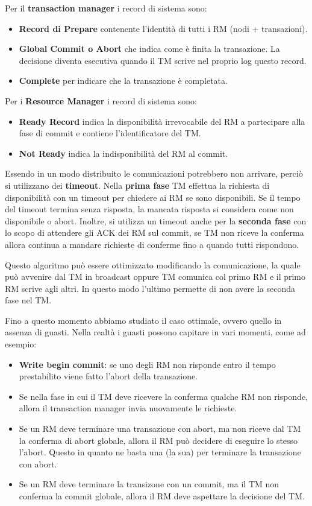 Per il \textbf{transaction manager} i record di sistema sono:
\begin{itemize}
    \item \textbf{Record di Prepare} contenente l'identità di tutti i RM (nodi + transazioni).
    \item \textbf{Global Commit o Abort} che indica come è finita la transazione. La
          decisione diventa esecutiva quando il TM scrive nel proprio log
          questo record.
    \item \textbf{Complete} per indicare che la transazione è completata.
\end{itemize}
Per i \textbf{Resource Manager} i record di sistema sono:
\begin{itemize}
    \item \textbf{Ready Record} indica la disponibilità irrevocabile del RM a partecipare
          alla fase di commit e contiene l'identificatore del TM.
    \item \textbf{Not Ready} indica la indisponibilità del RM al commit.
\end{itemize}

Essendo in un modo distribuito le comunicazioni potrebbero non arrivare, perciò
si utilizzano dei \textbf{timeout}.
Nella \textbf{prima fase} TM effettua la richiesta di disponibilità con un timeout
per chiedere ai RM se sono disponibili. Se il tempo del timeout termina senza risposta, la mancata
risposta si considera come non disponibile
o abort. Inoltre, si utilizza un timeout anche per la \textbf{seconda fase} con lo
scopo di attendere gli ACK dei RM sul commit, se TM non riceve la conferma allora continua
a mandare richieste di conferme fino a quando tutti rispondono.

Questo algoritmo può essere ottimizzato modificando la comunicazione, la quale
può avvenire dal TM in broadcast oppure TM comunica col primo RM e il primo RM
scrive agli altri. In questo modo l'ultimo permette di non avere la seconda fase
nel TM.

Fino a questo momento abbiamo studiato il caso ottimale, ovvero quello in assenza
di guasti. Nella realtà i guasti possono capitare in vari momenti, come ad esempio:
\begin{itemize}
    \item \textbf{Write begin commit}: se uno degli RM non risponde entro il tempo
          prestabilito viene fatto l'abort della transazione.
    \item Se nella fase in cui il TM deve ricevere la conferma qualche RM non
          risponde, allora il transaction manager invia nuovamente le richieste.
    \item Se un RM deve terminare una transazione con abort, ma non riceve dal TM
          la conferma di abort globale, allora il RM può decidere di eseguire lo stesso
          l'abort. Questo in quanto ne basta una (la sua) per terminare la
          transazione con abort.
    \item Se un RM deve terminare la transizone con un commit, ma il TM non
          conferma la commit globale, allora il RM deve aspettare la decisione
          del TM.
\end{itemize}

